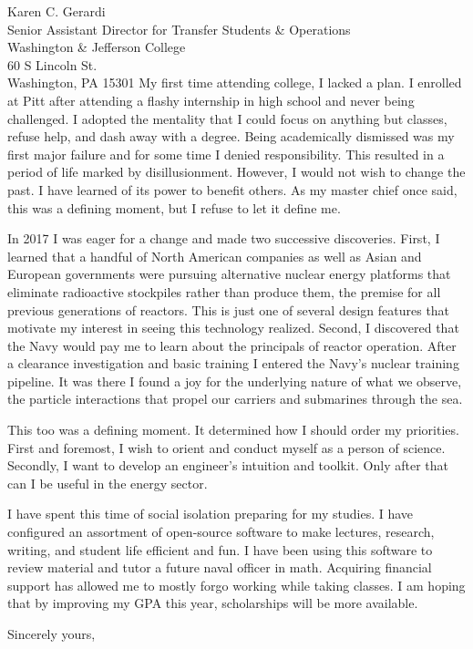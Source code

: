 \documentclass[11pt]{letter} %
\begin{document}
\begin{letter}{Karen C. Gerardi\\
Senior Assistant Director for Transfer Students \& Operations \\
Washington \& Jefferson College\\
60 S Lincoln St.\\
Washington, PA 15301}
My first time attending college, I lacked a plan. I enrolled at Pitt after attending a flashy internship in high school and never being challenged. I adopted the mentality that I could focus on anything but classes, refuse help, and dash away with a degree. Being academically dismissed was my first major failure and for some time I denied responsibility. This resulted in a period of life marked by disillusionment. However, I would not wish to change the past. I have learned of its power to benefit others. As my master chief once said, this was a defining moment, but I refuse to let it define me.

In 2017 I was eager for a change and made two successive discoveries. First, I learned that a handful of North American companies as well as Asian and European governments were pursuing alternative nuclear energy platforms that eliminate radioactive stockpiles rather than produce them, the premise for all previous generations of reactors. This is just one of several design features that motivate my interest in seeing this technology realized. Second, I discovered that the Navy would pay me to learn about the principals of reactor operation. After a clearance investigation and basic training I entered the Navy's nuclear training pipeline. It was there I found a joy for the underlying nature of what we observe, the particle interactions that propel our carriers and submarines through the sea.

This too was a defining moment. It determined how I should order my priorities. First and foremost, I wish to orient and conduct myself as a person of science. Secondly, I want to develop an engineer's intuition and toolkit. Only after that can I be useful in the energy sector.

I have spent this time of social isolation preparing for my studies. I have configured an assortment of open-source software to make lectures, research, writing, and student life efficient and fun. I have been using this software to review material and tutor a future naval officer in math. Acquiring financial support has allowed me to mostly forgo working while taking classes. I am hoping that by improving my GPA this year, scholarships will be more available.
\closing{Sincerely yours,}




\end{letter}
\end{document}
